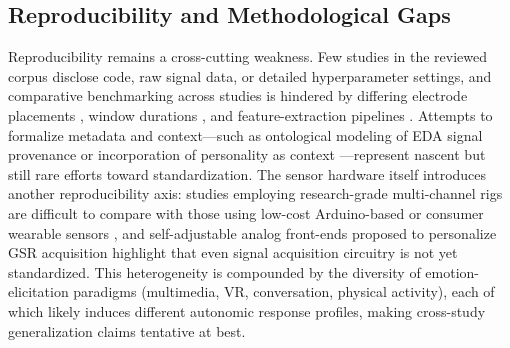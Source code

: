 \subsection{Reproducibility and Methodological Gaps}
Reproducibility remains a cross-cutting weakness. Few studies in the reviewed corpus disclose code, raw signal data, or detailed hyperparameter settings, and comparative benchmarking across studies is hindered by differing electrode placements \cite{sanchezcomas2021correlation,noori2025sensitivity}, window durations \cite{bamonte2024determining}, and feature-extraction pipelines \cite{diaz2024fractal,veeranki2024comparison}. Attempts to formalize metadata and context---such as ontological modeling of EDA signal provenance \cite{zawadzka2023ontological} or incorporation of personality as context \cite{pant2023phymer}---represent nascent but still rare efforts toward standardization. The sensor hardware itself introduces another reproducibility axis: studies employing research-grade multi-channel rigs \cite{liu2018human,wei2018emotion} are difficult to compare with those using low-cost Arduino-based or consumer wearable sensors \cite{shahid2026comparative,patil2023face,baldassarri2023wearables}, and self-adjustable analog front-ends proposed to personalize GSR acquisition \cite{miranda2023self} highlight that even signal acquisition circuitry is not yet standardized. This heterogeneity is compounded by the diversity of emotion-elicitation paradigms (multimedia, VR, conversation, physical activity), each of which likely induces different autonomic response profiles, making cross-study generalization claims tentative at best.

